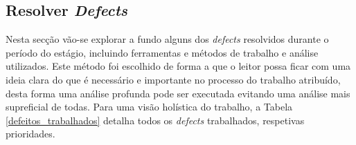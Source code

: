     \subsection{Resolver \textit{Defects}}\label{sub:defects}

        Nesta secção vão-se explorar a fundo alguns dos \textit{defects} resolvidos durante o período do estágio, incluindo ferramentas e métodos de trabalho e análise utilizados. Este método foi escolhido de forma a que o leitor possa ficar com uma ideia clara do que é necessário e importante no processo do trabalho atribuído, desta forma uma análise profunda pode ser executada evitando uma análise mais supreficial de todas. Para uma visão holística do trabalho, a Tabela \ref{defeitos_trabalhados} detalha todos os \textit{defects} trabalhados, respetivas prioridades.
        
